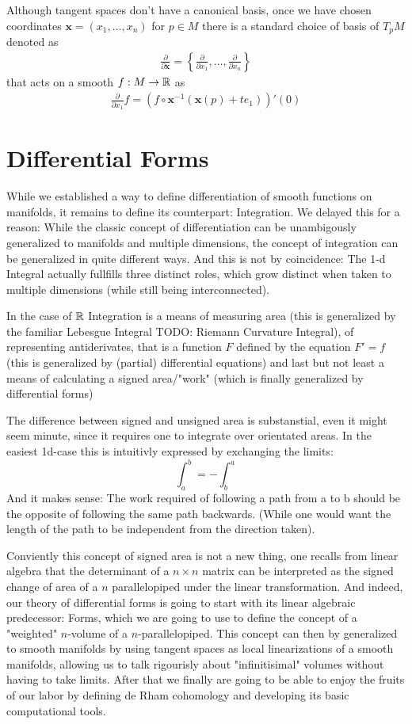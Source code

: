 Although tangent spaces don't have a canonical basis, once we have chosen coordinates
$\mathbf{x} = (x_1, \dots, x_n)$ for $p \in M$ there is a standard choice of basis of
$T_pM$ denoted as 
\begin{align*}
	\frac{\partial}{\partial \mathbf{x}} = 
		\left\{\frac{\partial}{\partial x_1}, \dots, \frac{\partial}{\partial x_n}\right\}
\end{align*}
that acts on a smooth $f: M \to \mathbb{R}$ as
\begin{align*}
	\frac{\partial}{\partial x_1} f = (f \circ \mathbf{x}^{-1}(\mathbf{x}(p) + t e_1))'(0)
\end{align*}

\section{Differential Forms}
While we established a way to define differentiation of smooth functions on manifolds,
it remains to define its counterpart: Integration. We delayed this for a reason: While
the classic concept of differentiation can be unambigously generalized to manifolds and
multiple dimensions, the concept of integration can be generalized in quite different ways.
And this is not by coincidence: The 1-d Integral actually fullfills three distinct roles,
which grow distinct when taken to multiple dimensions (while still being interconnected).

In the case of $\mathbb{R}$ Integration is a means of measuring area (this is generalized by the familiar
Lebesgue Integral TODO: Riemann Curvature Integral), of representing antiderivates, that is
a function $F$ defined by the equation $F' = f$ (this is generalized by (partial) differential
equations) and last but not least a means of calculating a signed area/"work" (which is
finally generalized by differential forms)

The difference between signed and unsigned area is substanstial, even it might seem minute,
since it requires one to integrate over orientated areas. In the easiest 1d-case this is intuitivly
expressed by exchanging the limits:
\[
	\int_a^b = -\int_b^a	
\]
And it makes sense: The work required of following a path from a to b should be the opposite of
following the same path backwards. (While one would want the length of the path to be independent
from the direction taken).

Conviently this concept of signed area is not a new thing, one recalls from linear algebra that
the determinant of a $n \times n$ matrix can be interpreted as the signed change of area of a
$n$ parallelopiped under the linear transformation. And indeed, our theory of differential
forms is going to start with its linear algebraic predecessor: Forms, which we are going
to use to define the concept of a "weighted" $n$-volume of a $n$-parallelopiped. This concept
can then by generalized to smooth manifolds by using tangent spaces as local linearizations
of a smooth manifolds, allowing us to talk rigourisly about "infinitisimal" volumes without
having to take limits. After that we finally are going to be able to enjoy the fruits of our
labor by defining de Rham cohomology and developing its basic computational tools.

